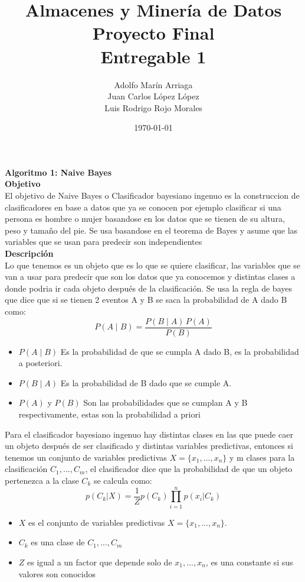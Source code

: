 \documentclass{article}
\title{Almacenes y Minería de Datos \\Proyecto Final\\ Entregable 1}
\author{Adolfo Marín Arriaga\\Juan Carlos López López\\Luis Rodrigo Rojo Morales}
\date{\today\\}
\begin{document}
 \maketitle
 
 {\bf Algoritmo 1: Naive Bayes}\\
 {\bf Objetivo}\\
 El objetivo de Naive Bayes o Clasificador bayesiano ingenuo es la construccion de clasificadores en base a datos que ya se conocen por ejemplo clasificar si una persona es hombre o mujer basandose
 en los datos que se tienen de su altura, peso y tamaño del pie. Se usa basandose en el teorema de Bayes y asume que las variables que se usan para predecir son 
 independientes\\
 {\bf Descripción}\\
 Lo que tenemos es un objeto que es lo que se quiere clasificar, las variables que se van a usar para predecir que son los datos que ya conocemos y distintas clases a donde podria 
 ir cada objeto después de la clasificación. Se usa la regla de bayes que dice que si se tienen 2 eventos A y B se saca la probabilidad de A dado B como:
 $$ P(A \mid B) = \frac{P(B \mid A) \, P(A)}{P(B)} $$
 \begin{itemize}
  \item $P(A \mid B)$ Es la probabilidad de que se cumpla  A dado B, es la probabilidad a posteriori.
  \item $P(B \mid A)$ Es la probabilidad de B dado que se cumple A.
  \item $P(A)$ y $P(B)$ Son las probabilidades que se cumplan A y B respectivamente, estas son la probabilidad a priori
 \end{itemize}
 Para el clasificador bayesiano ingenuo hay distintas clases en las que puede caer un objeto después de ser clasificado y distintas variables predictivas, entonces
 si tenemos un conjunto de variables predictivas $X=\{x_1,...,x_n\}$ y m clases para la clasificación $C_1,...,C_m$, el clasificador dice que la 
 probabilidad de que un objeto pertenezca a la clase $C_k$ se calcula como:
 \begin{equation*}
 p(C_k|X)=\frac{1}{Z}p(C_k)\prod_{i=1}^{n}p(x_i|C_k)
 \end{equation*}
 \begin{itemize}
  \item $X$ es el conjunto de variables predictivas $X=\{x_1,...,x_n\}$.
  \item $C_k$ es una clase de $C_1,...,C_m$
  \item $Z$ es igual a un factor que depende solo de $x_1,...,x_n$, es una constante si sus valores son conocidos
 \end{itemize}
\end{document}
